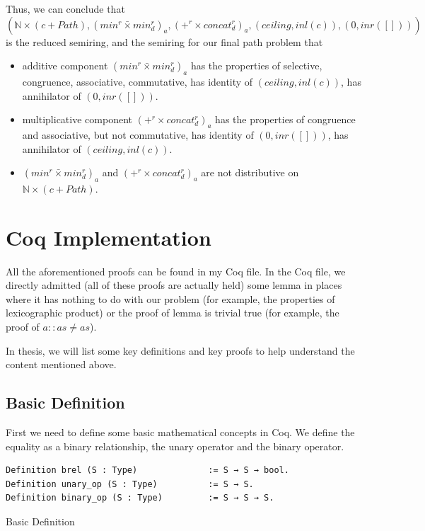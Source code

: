 \documentclass[a4paper,12pt,twoside,openright]{report}
\begin{document}
Thus, we can conclude that \[(\mathbb{N} \times (c + Path),(min^r \bar{\times} min^r_d)_a,(+^r \times concat^r_d)_a,(ceiling,inl(c)),(0,inr([])))\] is the reduced semiring, and the semiring for our final path problem that 
\begin{itemize}
  \item additive component $(min^r \bar{\times} min^r_d)_a$ has the properties of selective, congruence, associative, commutative, has identity of $(ceiling,inl(c))$, has annihilator of $(0,inr([]))$.
  \item multiplicative component $(+^r \times concat^r_d)_a$ has the properties of congruence and associative, but not commutative, has identity of $(0,inr([]))$, has annihilator of $(ceiling,inl(c))$.
  \item $(min^r \bar{\times} min^r_d)_a$ and $(+^r \times concat^r_d)_a$ are not distributive on $\mathbb{N} \times (c + Path)$.
\end{itemize}

\section{Coq Implementation}
All the aforementioned proofs can be found in my Coq file.
In the Coq file, we directly admitted (all of these proofs are actually held) some lemma in places where it has nothing to do with our problem (for example, the properties of lexicographic product) or the proof of lemma is trivial true (for example, the proof of $a::as \neq as$).

In thesis, we will list some key definitions and key proofs to help understand the content mentioned above.

\subsection{Basic Definition}
First we need to define some basic mathematical concepts in Coq. We define the equality as a binary relationship, the unary operator and the binary operator.
\begin{listing}[H]
\begin{verbatim}
Definition brel (S : Type)              := S → S → bool.
Definition unary_op (S : Type)          := S → S. 
Definition binary_op (S : Type)         := S → S → S. 
\end{verbatim}
\caption{Basic Definition} 
\label{coq:def:basic}
\end{listing}
\end{document}
